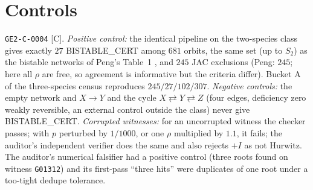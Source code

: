 \documentclass[11pt]{article}
\newcommand{\tier}[1]{\textsf{[#1]}}
\newcommand{\tC}{\tier{C}}
\begin{document}
\section{Controls}\label{sec:ctl}
\texttt{GE2-C-0004} \tC{}. \emph{Positive control:} the identical pipeline on the two-species class gives exactly $27$ BISTABLE\_CERT among $681$ orbits, the same set (up to $S_2$) as the bistable networks of Peng's Table~1 \cite{peng}, and $245$ JAC exclusions (Peng: $245$; here all $\rho$ are free, so agreement is informative but the criteria differ). Bucket A of the three-species census reproduces $245/27/102/307$. \emph{Negative controls:} the empty network and $X\to Y$ and the cycle $X\rightleftarrows Y\rightleftarrows Z$ (four edges, deficiency zero weakly reversible, an external control outside the class) never give BISTABLE\_CERT. \emph{Corrupted witnesses:} for an uncorrupted witness the checker passes; with $p$ perturbed by $1/1000$, or one $\rho$ multiplied by $1.1$, it fails; the auditor's independent verifier does the same and also rejects $+I$ as not Hurwitz. The auditor's numerical falsifier had a positive control (three roots found on witness \texttt{G01312}) and its first-pass ``three hits'' were duplicates of one root under a too-tight dedupe tolerance.

\end{document}
